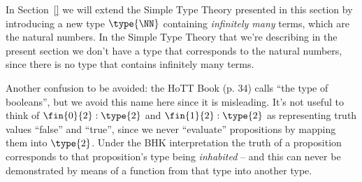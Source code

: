 In Section~\ref{} we will extend the Simple Type Theory presented in this section by introducing a new type $\type{\NN}$ containing \emph{infinitely many} terms, which are the natural numbers.  In the Simple Type Theory that we're describing in the present section we don't have a type that corresponds to the natural numbers, since there is no type that contains infinitely many terms.


Another confusion to be avoided: 
the HoTT Book (p. 34) calls  ``the type of booleans'', but we avoid this name here since it is misleading.  It's not useful to think of $\fin{0}{2}:\type{2}$ and $\fin{1}{2}:\type{2}$ as  representing truth values ``false'' and ``true'', since we never ``evaluate'' propositions by mapping them into $\type{2}$.  
Under the BHK interpretation the truth of a proposition corresponds to that proposition's type being \emph{inhabited} -- and this can never be demonstrated by means of a function from that type into another type.







